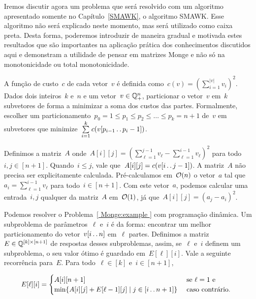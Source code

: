 Iremos discutir agora um problema que será resolvido com um algoritmo apresentado somente no Capítulo~\ref{SMAWK}, o algoritmo SMAWK. Esse algoritmo não será explicado neste momento, mas será utilizado como caixa preta. Desta forma, poderemos introduzir de maneira gradual e motivada estes resultados que são importantes na aplicação prática dos conhecimentos discutidos aqui e demonstram a utilidade de pensar em matrizes Monge e não só na monotonicidade ou total monotonicidade.  

\begin{prob} \label{ Monge:example }
A função de custo~$c$ de cada vetor~$v$ é definida como~$c(v) = \left( \sum\limits_{i=1}^{|v|} v_i \right)^2$. Dados dois inteiros~$k$ e~$n$ e um vetor~${ v \in \mathbb{Q}^n_+ }$, particionar o vetor~$v$ em~$k$ subvetores de forma a minimizar a soma dos custos das partes. Formalmente, escolher um particionamento~${ p_0 = 1 \leq p_1 \leq p_2 \leq \dots \leq p_k = n+1 }$ de~$v$ em subvetores que minimize~$\sum\limits_{i=1}^k c(v[p_{i-1} \,.\,.\, p_i - 1])$.
\end{prob}

Definimos a matriz~$A$ onde~${ A[i][j] = \left(\sum\limits_{\ell=1}^{j-1} v_\ell - \sum\limits_{\ell=1}^{i-1} v_\ell \right)^2 }$ para todo~${ i,j \in [n+1] }$. Quando~${ i \leq j }$, vale que~${ A[i][j] = c(v[i \,.\,.\, j-1]) }$. A matriz~$A$ não precisa ser explicitamente calculada. Pré-calculamos em~$\mathcal{O}(n)$ o vetor~$a$ tal que~${ a_i = \sum_{\ell=1}^{i-1} v_\ell }$ para todo~${ i \in [n+1] }$. Com este vetor~$a$, podemos calcular uma entrada~$i,j$ qualquer da matriz~$A$ em~$\mathcal{O}(1)$, já que~${ A[i][j] = (a_j - a_i)^2 }$.

Podemos resolver o Problema~\ref{ Monge:example } com programação dinâmica. Um subproblema de parâmetros~$\ell$ e~$i$ é da forma: encontrar um melhor particionamento do vetor~${v[i \,.\,.\, n]}$ em~$\ell$ partes. Definimos a matriz~${E \in \mathbb{Q}^{[k] \times [n+1]}}$ de respostas desses subproblemas, assim, se~$\ell$ e~$i$ definem um subproblema, o seu valor ótimo é guardado em~$E[\ell][i]$. Vale a seguinte recorrência para~$E$. Para todo~$\ell \in [k]$ e~$i \in [n+1]$,

\begin{equation*}
E[\ell][i] = \begin{cases}
    A[i][n+1]                                                   & \text{ se } \ell = 1 \text{ e } \\
    \min\{ A[i][j] + E[\ell-1][j] \mid j \in [i \,.\,.\, n+1] \}     & \text{ caso contrário. }
\end{cases}
\end{equation*}

